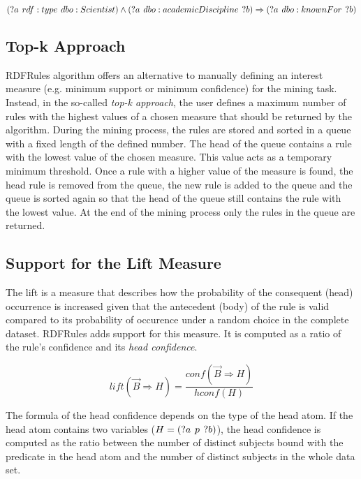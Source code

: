 $$(?a\hspace{0.4em} rdf:type \hspace{0.4em}dbo:Scientist) \land (?a\hspace{0.4em} dbo:academicDiscipline \hspace{0.4em}?b) \Rightarrow (?a\hspace{0.4em}dbo:knownFor \hspace{0.4em}?b)$$

\subsection{Top-k Approach}

RDFRules algorithm offers an alternative to manually defining an interest measure (e.g. minimum support or minimum confidence) for the mining task. Instead, in the so-called \textit{top-k approach}, the user defines a maximum number of rules with the highest values of a chosen measure that should be returned by the algorithm. During the mining process, the rules are stored and sorted in a queue with a fixed length of the defined number. The head of the queue  contains a rule with the lowest value of the chosen measure. This value acts as a temporary minimum threshold. Once a rule with a higher value of the measure is found, the head rule is removed from the queue, the new rule is added to the queue and the queue is sorted again so that the head of the queue still contains the rule with the lowest value. At the end of the mining process only the rules in the queue are returned. 

\subsection{Support for the Lift Measure}

The lift is a measure that describes how the probability of the consequent (head) occurrence is increased given that the antecedent (body) of the rule is valid compared to its probability of occurence under a random choice in the complete dataset. RDFRules adds support for this measure. It is computed as a ratio of the rule's confidence and its \textit{head confidence}.

$$lift(\vec{B} \Rightarrow H) = \frac{conf(\vec{B} \Rightarrow H)}{hconf(H)}$$

The formula of the head confidence depends on the type of the head atom. If the head atom contains two variables ($H = (?a\hspace{0.4em}p\hspace{0.4em}?b)$), the head confidence is computed as the ratio between the number of distinct subjects bound with the predicate in the head atom and the number of distinct subjects in the whole data set.

